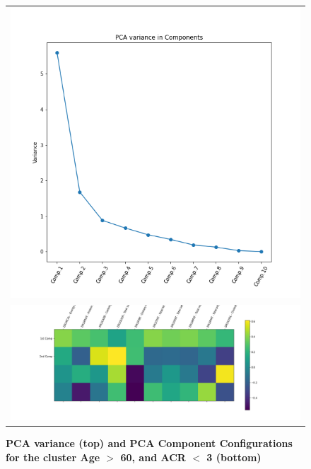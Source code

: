 \begin{figure}
\begin{tabular}{c}
\includegraphics[scale=0.4]{images/pca_components_variance} \\
\includegraphics[scale=0.4]{images/pca_food_groups_what_contributes_to_PCA_components.png} \\
\end{tabular}
\caption{\textbf{PCA variance (top) and PCA Component Configurations for the cluster Age $>$ 60, and ACR $<$ 3 (bottom) }}
\label{pca-v-food-comp}
\vspace{0.25cm}
\end{figure}

